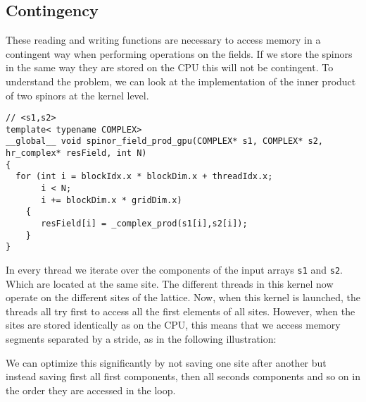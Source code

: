 \documentclass[12pt]{article}
\begin{document}
\subsection*{Contingency}
These reading and writing functions are necessary to access memory in a contingent way when performing operations on the fields. If we store the spinors in the same way they are stored on the CPU this will not be contingent. To understand the problem, we can look at the implementation of the inner product of two spinors at the kernel level.
\begin{lstlisting}[caption=Kernel implementation of spinor product]
// <s1,s2>
template< typename COMPLEX>
__global__ void spinor_field_prod_gpu(COMPLEX* s1, COMPLEX* s2, hr_complex* resField, int N)
{
  for (int i = blockIdx.x * blockDim.x + threadIdx.x;
       i < N;
       i += blockDim.x * gridDim.x)
    {
       resField[i] = _complex_prod(s1[i],s2[i]);
    }
}
\end{lstlisting}
In every thread we iterate over the components of the input arrays \texttt{s1} and \texttt{s2}. Which are located at the same site. The different threads in this kernel now operate on the different sites of the lattice. Now, when this kernel is launched, the threads all try first to access all the first elements of all sites. However, when the sites are stored identically as on the CPU, this means that we access memory segments separated by a stride, as in the following illustration:
\begin{figure}[H]
\centering
{}
\end{figure}
We can optimize this significantly by not saving one site after another but instead saving first all first components, then all seconds components and so on in the order they are accessed in the loop.
\begin{figure}[H]
\centering
{}
\end{figure}
\end{document}
